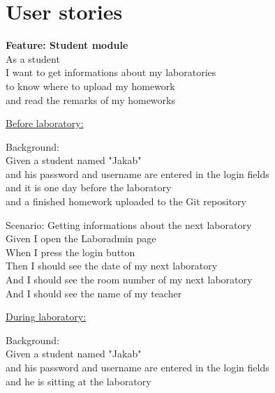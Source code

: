 \chapter{User stories}

\textbf{Feature: Student module}\\ \hspace*{1cm}
As a student\\ \hspace*{1cm}
I want to get informations about my laboratories\\ \hspace*{1cm}
to know where to upload my homework\\ \hspace*{1cm}
and read the remarks of my homeworks

\underline{Before laboratory:}

Background:\\ \hspace*{1cm}
Given a student named "Jakab"\\ \hspace*{1cm}
and his password and username are entered in the login fields\\ \hspace*{1cm}
and it is one day before the laboratory\\ \hspace*{1cm}
and a finished homework uploaded to the Git repository

Scenario: Getting informations about the next laboratory\\ \hspace*{1cm}
Given I open the Laboradmin page\\ \hspace*{1cm}
When I press the login button\\ \hspace*{1cm}
Then I should see the date of my next laboratory\\ \hspace*{1cm}
And  I should see the room number of my next laboratory\\ \hspace*{1cm}
And I should see the name of my teacher

\underline{During laboratory:}

Background:\\ \hspace*{1cm}
Given a student named "Jakab"\\ \hspace*{1cm}
and his password and username are entered in the login fields\\ \hspace*{1cm}
and he is sitting at the laboratory

